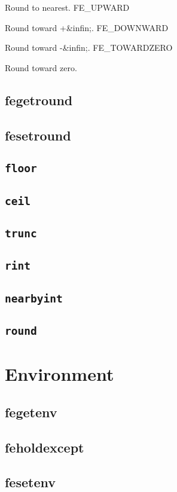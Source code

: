 \documentclass[a4paper]{book}
\theoremstyle{definition}
\theoremstyle{remark}
\begin{document}
    Round to nearest.
FE_UPWARD

    Round toward +&infin;.
FE_DOWNWARD

    Round toward -&infin;.
FE_TOWARDZERO

    Round toward zero. 

\subsection{fegetround}
\subsection{fesetround}

\subsection{{\texttt{floor}}}
\subsection{{\texttt{ceil}}}
\subsection{{\texttt{trunc}}}
\subsection{{\texttt{rint}}}
\subsection{{\texttt{nearbyint}}}
\subsection{{\texttt{round}}}

\section{Environment}
\subsection{fegetenv}
\subsection{feholdexcept}
\subsection{fesetenv}
\end{document}
